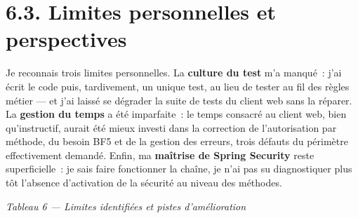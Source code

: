 \documentclass[12pt,a4paper]{report}
\begin{document}
\section*{6.3. Limites personnelles et perspectives}
Je reconnais trois limites personnelles. La \textbf{culture du test} m'a manqué~: j'ai écrit le code puis, tardivement, un unique test, au lieu de tester au fil des règles métier — et j'ai laissé se dégrader la suite de tests du client web sans la réparer. La \textbf{gestion du temps} a été imparfaite~: le temps consacré au client web, bien qu'instructif, aurait été mieux investi dans la correction de l'autorisation par méthode, du besoin BF5 et de la gestion des erreurs, trois défauts du périmètre effectivement demandé. Enfin, ma \textbf{maîtrise de Spring Security} reste superficielle~: je sais faire fonctionner la chaîne, je n'ai pas su diagnostiquer plus tôt l'absence d'activation de la sécurité au niveau des méthodes.
\begin{center}\textit{Tableau 6 — Limites identifiées et pistes d'amélioration}\end{center}
\end{document}
